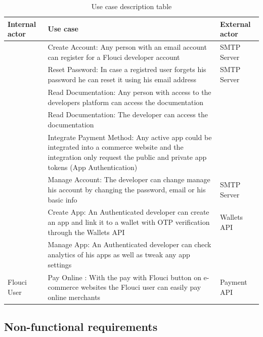 \begin{spacing}{1.2}
\begin{table}[!h]
	\centering
	\caption{Use case description table}
	\footnotesize
	\begin{tabularx}
	{\linewidth}{|>{\centering{}\vspace*{\fill}}X|>{\centering{}\vspace*{\fill}}X|>{\vspace*{\fill}}X<{\centering{}}|}	
			\hline 
			 \bfseries Internal actor & \bfseries Use case &\bfseries External actor \\
			\hline 
			\multirow{3}{*}{Anonymous Developer}			&	Create Account: Any person with an email account can register for a Flouci developer account	&	SMTP Server			\\
			\cline{2-3}
				& Reset Password: In case a registred user forgets his password he can reset it using his email address 		&		SMTP Server		\\
				\cline{2-3}
					&	Read Documentation: Any person with access to the developers platform can access the documentation	&				\\
			\hline 
			\multirow{5}{*}{Registred Developer}					&	Read Documentation: The developer can access the documentation 	&				\\
			\cline{2-3}
			&	Integrate Payment Method: Any active app could be integrated into a commerce website and the integration only request the public and private app tokens (App Authentication)	&				\\
			\cline{2-3}
					&	Manage Account: 	 The developer can change manage his account by changing the password, email or his basic info	&		SMTP Server	\\
					\cline{2-3}
					&	Create App: An Authenticated developer can create an app and link it to a wallet with OTP verification through the Wallets API	&			Wallets API	\\
					\cline{2-3}
					&	Manage App:	An Authenticated  developer can check analytics of his apps as well as tweak any app settings &				\\		
					
			\hline 
			Flouci User	& Pay Online : With the pay with Flouci button on e-commerce websites the Flouci user can easily pay online merchants  	&	Payment API	\\
			
			\hline
	\end{tabularx}
	\label{tab:usecasediagram}
\end{table}


\subsection{Non-functional requirements}

\end{spacing}
